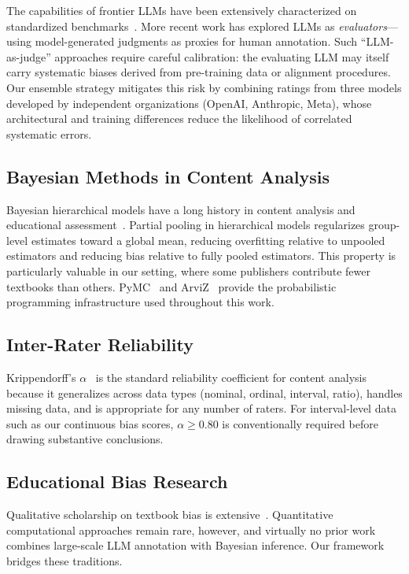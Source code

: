 \documentclass[10pt,letterpaper]{article}
\begin{document}
The capabilities of frontier LLMs have been extensively characterized on
standardized benchmarks~\citep{openai2024gpt4o, anthropic2025claude,
meta2025llama32}.  More recent work has explored LLMs as \emph{evaluators}---using
model-generated judgments as proxies for human annotation.  Such ``LLM-as-judge''
approaches require careful calibration: the evaluating LLM may itself carry
systematic biases derived from pre-training data or alignment procedures.  Our
ensemble strategy mitigates this risk by combining ratings from three models
developed by independent organizations (OpenAI, Anthropic, Meta), whose
architectural and training differences reduce the likelihood of correlated
systematic errors.

\subsection{Bayesian Methods in Content Analysis}

Bayesian hierarchical models have a long history in content analysis and
educational assessment~\citep{gelman2020bda, mcelreath2024rethinking}.  Partial
pooling in hierarchical models regularizes group-level estimates toward a global
mean, reducing overfitting relative to unpooled estimators and reducing bias
relative to fully pooled estimators.  This property is particularly valuable in
our setting, where some publishers contribute fewer textbooks than others.
PyMC~\citep{abril2023pymc} and ArviZ~\citep{kumar2019arviz} provide the
probabilistic programming infrastructure used throughout this work.

\subsection{Inter-Rater Reliability}

Krippendorff's $\alpha$~\citep{krippendorff2018content} is the standard
reliability coefficient for content analysis because it generalizes across data
types (nominal, ordinal, interval, ratio), handles missing data, and is
appropriate for any number of raters.  For interval-level data such as our
continuous bias scores, $\alpha \geq 0.80$ is conventionally required before
drawing substantive conclusions.

\subsection{Educational Bias Research}

Qualitative scholarship on textbook bias is extensive~\citep{loewen2018lies,
fitzgerald2009textbooks}.  Quantitative computational approaches remain rare,
however, and virtually no prior work combines large-scale LLM annotation with
Bayesian inference.  Our framework bridges these traditions.
\end{document}
